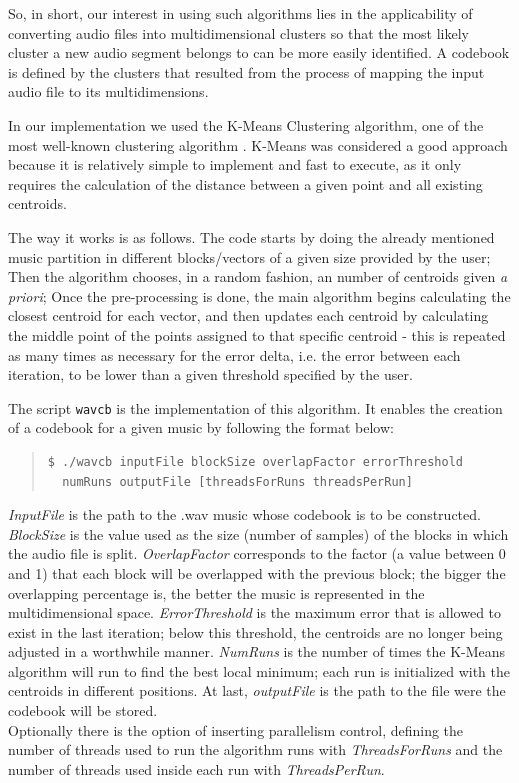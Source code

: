 \documentclass[12pt]{article}
\begin{document}
So, in short, our interest in using such algorithms lies in the applicability of 
converting audio files into multidimensional clusters so that the most likely
cluster a new audio segment belongs to can be more easily identified.
A codebook is defined by the clusters that resulted from the process of mapping
the input audio file to its multidimensions.

In our implementation we used the K-Means Clustering algorithm, one of the 
most well-known clustering algorithm \cite{clustering}. 
K-Means was considered a good approach because it is relatively simple to 
implement and fast to execute, as it only requires the calculation of the 
distance between a given point and all existing centroids. 

The way it works is as follows.
The code starts by doing the already mentioned music partition in different 
blocks/vectors of a given size provided by the user;
Then the algorithm chooses, in a random fashion, an number of centroids given 
{\it a priori\/};
Once the pre-processing is done, the main algorithm begins calculating the 
closest centroid for each vector, and then updates each centroid by calculating 
the middle point of the points assigned to that specific centroid - this is 
repeated as many times as necessary for the error delta, i.e. the error between 
each iteration, to be lower than a given threshold specified by the user. 

The script \texttt{wavcb} is the implementation of this algorithm.
It enables the creation of a codebook for a given music by following the format 
below:

\begingroup
\addtolength\leftmargini{-0.4in}
\begin{quote}
\begin{verbatim}
$ ./wavcb inputFile blockSize overlapFactor errorThreshold
  numRuns outputFile [threadsForRuns threadsPerRun]
\end{verbatim}
\end{quote}
\endgroup

{\it InputFile\/} is the path to the .wav music whose codebook is to be constructed.
{\it BlockSize\/} is the value used as the size (number of samples) of the blocks 
in which the audio file is split.
{\it OverlapFactor\/} corresponds to the factor (a value between 0 and 1) that 
each block will be overlapped with the previous block; the bigger the overlapping
percentage is, the better the music is represented in the multidimensional space.
{\it ErrorThreshold\/} is the maximum error that is allowed to exist in the last 
iteration; below this threshold, the centroids are no longer being adjusted in a 
worthwhile manner.
{\it NumRuns\/} is the number of times the K-Means algorithm will run to find 
the best local minimum; each run is initialized with the centroids in different 
positions.
At last, {\it outputFile\/} is the path to the file were the codebook will be stored. \\
Optionally there is the option of inserting parallelism control, defining the number of threads used to run the algorithm runs with  {\it ThreadsForRuns\/} and the number of threads used inside each run with {\it ThreadsPerRun\/}.\\
\end{document}
